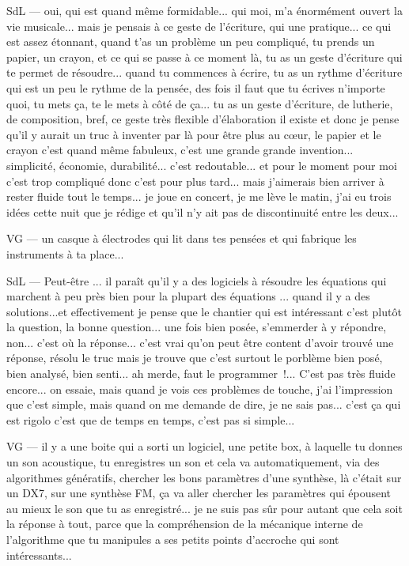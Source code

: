 SdL — oui, qui est quand même formidable... qui moi, m'a énormément ouvert la vie musicale... mais je pensais à ce geste de l'écriture, qui une pratique... ce qui est assez étonnant, quand t'as un problème un peu compliqué, tu prends un papier, un crayon, et ce qui se passe à ce moment là, tu as un geste d'écriture qui te permet de résoudre... quand tu commences à écrire, tu as un rythme d'écriture qui est un peu le rythme de la pensée, des fois il faut que tu écrives n'importe quoi, tu mets ça, te le mets à côté de ça... tu as un geste d'écriture, de lutherie, de composition, bref, ce geste très flexible d'élaboration il existe et donc je pense qu'il y aurait un truc à inventer par là pour être plus au cœur, le papier et le crayon c'est quand même fabuleux, c'est une grande grande invention... simplicité, économie, durabilité... c'est redoutable... et pour le moment pour moi c'est trop compliqué donc c'est pour plus tard... mais j'aimerais bien arriver à rester fluide tout le temps... je joue en concert, je me lève le matin, j'ai eu trois idées cette nuit que je rédige et qu'il n'y ait pas de discontinuité entre les deux...  

VG — un casque à électrodes qui lit dans tes pensées et qui fabrique les instruments à ta place... 

SdL — Peut-être ... il paraît qu'il y a des logiciels à résoudre les équations qui marchent à peu près bien pour la plupart des équations ... quand il y a des solutions...et effectivement je pense que le chantier qui est intéressant c'est plutôt la question, la bonne question... une fois bien posée, s'emmerder à y répondre, non... c'est où la réponse... c'est vrai qu'on peut être content d'avoir trouvé une réponse, résolu le truc mais je trouve que c'est surtout le porblème bien posé, bien analysé, bien senti... ah merde, faut le programmer !... C'est pas très fluide encore... on essaie, mais quand je vois ces problèmes de touche, j'ai l'impression que c'est simple, mais quand on me demande de dire, je ne sais pas... c'est ça qui est rigolo c'est que de temps en temps, c'est pas si simple... 

VG — il y a une boite qui a sorti un logiciel, une petite box, à laquelle tu donnes un son acoustique, tu enregistres un son et cela va automatiquement, via des algorithmes génératifs, chercher les bons paramètres d'une synthèse, là c'était sur un DX7, sur une synthèse FM, ça va aller chercher les paramètres qui épousent au mieux le son que tu as enregistré... je ne suis pas sûr pour autant que cela soit la réponse à tout, parce que la compréhension de la mécanique interne de l'algorithme que tu manipules a ses petits points d'accroche qui sont intéressants... 

